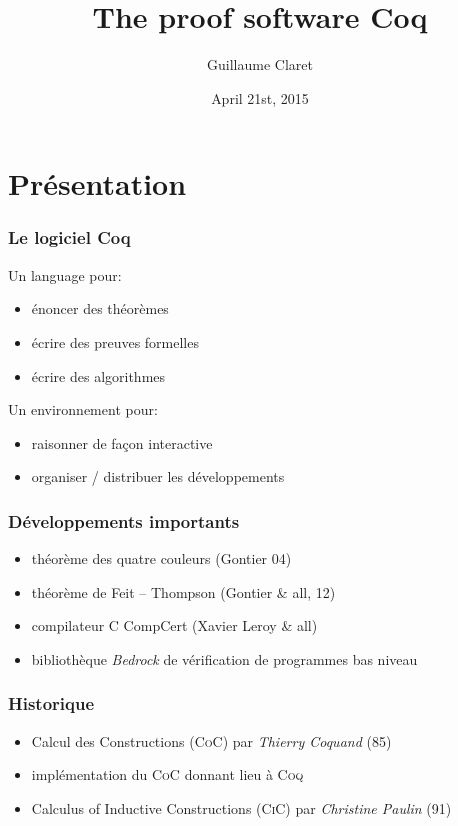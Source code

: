 \documentclass[hyperref={pdfpagelabels=false}]{beamer}
\begin{document}
\title{The proof software Coq}
\author{Guillaume Claret}
\date{April 21st, 2015}
\maketitle

\section{Présentation}
\begin{frame}
  \frametitle{Le logiciel Coq}
  Un language pour:
  \begin{itemize}
    \item énoncer des théorèmes
    \item écrire des preuves formelles
    \item écrire des algorithmes
  \end{itemize}

  Un environnement pour:
  \begin{itemize}
    \item raisonner de façon interactive
    \item organiser / distribuer les développements
  \end{itemize}
\end{frame}

\begin{frame}
  \frametitle{Développements importants}
  \begin{itemize}
    \item théorème des quatre couleurs (Gontier 04)
    \item théorème de Feit -- Thompson (Gontier \& all, 12)
    \item compilateur \textsc{C} CompCert (Xavier Leroy \& all)
    \item bibliothèque \emph{Bedrock} de vérification de programmes bas niveau
  \end{itemize}
\end{frame}

\begin{frame}
  \frametitle{Historique}
  \begin{itemize}
    \item Calcul des Constructions (\textsc{CoC}) par \emph{Thierry Coquand} (85)
    \item implémentation du \textsc{CoC} donnant lieu à \textsc{Coq}
    \item Calculus of Inductive Constructions (\textsc{CiC}) par \emph{Christine Paulin} (91)
  \end{itemize}
\end{frame}
\end{document}
